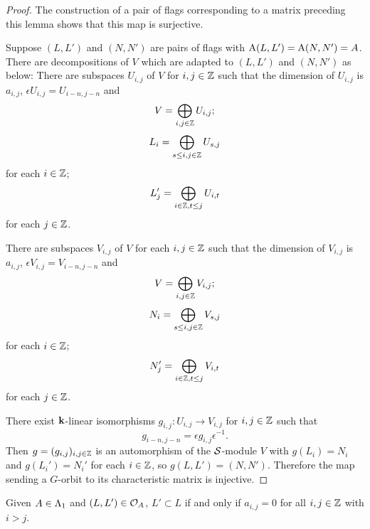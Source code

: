 \documentclass[a4paper, 11pt, twoside]{report}
\begin{document}
\begin{proof}
The construction of a pair of flags corresponding to a matrix preceding this lemma shows that this map is surjective.

Suppose $(L,L')$ and $(N,N')$ are pairs of flags with $\operatorname{A}(L,L')=\operatorname{A}(N,N')=A$. There are decompositions of $V$ which are adapted to $(L,L')$ and $(N,N')$ as below:
There are subspaces $U_{i,j}$ of $V$ for $i,j\in\mathbb{Z}$ such that the dimension of $U_{i,j}$ is $a_{i,j}$, $\epsilon U_{i,j}=U_{i-n,j-n}$ and
\begin{equation*}
V=\bigoplus_{i,j\in\mathbb{Z}} U_{i,j};
\end{equation*}
\begin{equation*}
L_i = \bigoplus_{s\le i,j\in\mathbb{Z}} U_{s,j}
\end{equation*}
for each $i\in\mathbb{Z}$;
\begin{equation*}
L_j' = \bigoplus_{i\in\mathbb{Z},t\le j} U_{i,t}
\end{equation*}
for each $j\in\mathbb{Z}$.

There are subspaces $V_{i,j}$ of $V$ for each $i,j\in\mathbb{Z}$ such that the dimension of $V_{i,j}$ is $a_{i,j}$, $\epsilon V_{i,j} = V_{i-n,j-n}$ and
\begin{equation*}
V = \bigoplus_{i,j\in\mathbb{Z}} V_{i,j};
\end{equation*}
\begin{equation*}
N_i = \bigoplus_{s\le i,j\in\mathbb{Z}} V_{s,j}
\end{equation*}
for each $i\in\mathbb{Z}$;
\begin{equation*}
N_j' = \bigoplus_{i\in\mathbb{Z},t\le j} V_{i,t}
\end{equation*}
for each $j\in\mathbb{Z}$.

There exist $\mathbf{k}$-linear isomorphisms $g_{i,j}\colon U_{i,j}\to V_{i,j}$ for $i,j\in\mathbb{Z}$ such that
\begin{equation*}
g_{i-n,j-n}=\epsilon g_{i,j}\epsilon^{-1}.
\end{equation*}
Then $g=(g_{i,j})_{i,j\in\mathbb{Z}}$ is an automorphism of the $\mathcal{S}$-module $V$ with $g(L_i)=N_i$ and $g(L_i')=N_i'$ for each $i\in\mathbb{Z}$, so $g(L,L')=(N,N')$. Therefore the map sending a $G$-orbit to its characteristic matrix is injective.
\end{proof}

\begin{lemma}
Given $A\in\Lambda_1{}$ and $(L,L')\in\mathcal{O}_{A}$, $L'\subset L$ if and only if $a_{i,j}=0$ for all $i,j\in\mathbb{Z}$ with $i>j$.
\end{lemma}
\end{document}
